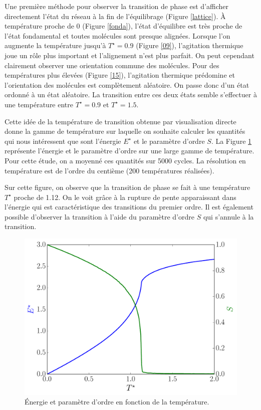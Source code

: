 \documentclass[11pt]{article}
\numberwithin{equation}{section}
\begin{document}
Une première méthode pour observer la transition de phase est d'afficher directement l'état du réseau à la fin de l'équilibrage (Figure \ref{lattice}). À température proche de 0 (Figure \ref{fonda}), l'état d'équilibre est très proche de l'état fondamental et toutes molécules sont presque alignées. Lorsque l'on augmente la température jusqu'à $T^\star = 0.9$ (Figure \ref{09}), l'agitation thermique joue un rôle plus important et l'alignement n'est plus parfait. On peut cependant clairement observer une orientation commune des molécules. Pour des températures plus élevées (Figure \ref{15}), l'agitation thermique prédomine et l'orientation des molécules est complètement aléatoire.
On passe donc d'un état ordonné à un état aléatoire. La transition entre ces deux états semble s'effectuer à une température entre $T^\star = 0.9$ et $T^\star = 1.5$. 
\medskip
\newpage

Cette idée de la température de transition obtenue par visualisation directe donne la gamme de température sur laquelle on souhaite calculer les quantités qui nous intéressent que sont l'énergie $E^\star$ et le paramètre d'ordre $S$. La Figure \ref{global} représente l'énergie et le paramètre d'ordre sur une large gamme de température. Pour cette étude, on a moyenné ces quantités sur 5000 cycles. La résolution en température est de l'ordre du centième (200 températures réalisées).
\medskip

Sur cette figure, on observe que la transition de phase se fait à une température $T^\star$ proche de 1.12. On le voit grâce à la rupture de pente apparaissant dans l'énergie qui est caractéristique des transitions du premier ordre. Il est également possible d'observer la transition à l'aide du paramètre d'ordre $S$ qui s'annule à la transition.

\begin{figure}[h!]
    \centering	    
	\includegraphics[scale=0.6]{figures/global.pdf}
    \caption{Énergie et paramètre d'ordre en fonction de la température.}
    	\label{global} 
\end{figure}
\end{document}
